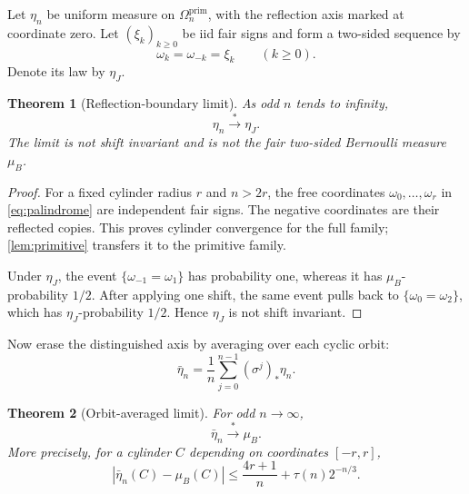 \documentclass[11pt]{article}
\newtheorem{theorem}{Theorem}[section]
\theoremstyle{remark}
\begin{document}
Let $\eta_n$ be uniform measure on $\Omega_n^{\mathrm{prim}}$, with the
reflection axis marked at coordinate zero.  Let $(\xi_k)_{k\ge0}$ be iid
fair signs and form a two-sided sequence by
\begin{equation}\label{eq:boundary-process}
 \omega_k=\omega_{-k}=\xi_k\qquad(k\ge0).
\end{equation}
Denote its law by $\eta_J$.

\begin{theorem}[Reflection-boundary limit]\label{thm:axis}
As odd $n$ tends to infinity,
\begin{equation}\label{eq:axis-limit}
 \eta_n\stackrel{*}{\longrightarrow}\eta_J.
\end{equation}
The limit is not shift invariant and is not the fair two-sided Bernoulli
measure $\mu_B$.
\end{theorem}

\begin{proof}
For a fixed cylinder radius $r$ and $n>2r$, the free coordinates
$\omega_0,\ldots,\omega_r$ in \eqref{eq:palindrome} are independent fair
signs.  The negative coordinates are their reflected copies.  This proves
cylinder convergence for the full family; \cref{lem:primitive} transfers it
to the primitive family.

Under $\eta_J$, the event $\{\omega_{-1}=\omega_1\}$ has probability one,
whereas it has $\mu_B$-probability $1/2$.  After applying one shift, the same
event pulls back to $\{\omega_0=\omega_2\}$, which has $\eta_J$-probability
$1/2$.  Hence $\eta_J$ is not shift invariant.
\end{proof}

Now erase the distinguished axis by averaging over each cyclic orbit:
\begin{equation}\label{eq:orbit-average}
 \bar\eta_n=\frac1n\sum_{j=0}^{n-1}(\sigma^j)_*\eta_n.
\end{equation}

\begin{theorem}[Orbit-averaged limit]\label{thm:orbit}
For odd $n\to\infty$,
\begin{equation}\label{eq:orbit-limit}
 \bar\eta_n\stackrel{*}{\longrightarrow}\mu_B.
\end{equation}
More precisely, for a cylinder $C$ depending on coordinates $[-r,r]$,
\begin{equation}\label{eq:cylinder-bound}
 |\bar\eta_n(C)-\mu_B(C)|
 \le \frac{4r+1}{n}+\tau(n)2^{-n/3}.
\end{equation}
\end{theorem}
\end{document}
